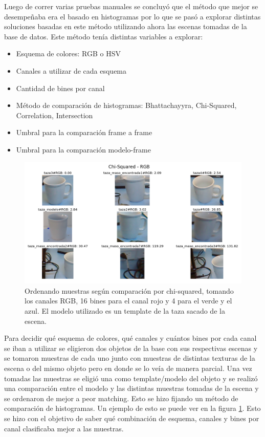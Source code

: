 Luego de correr varias pruebas manuales se concluyó que el método que mejor se desempeñaba era el basado en histogramas por lo que se pasó a explorar distintas soluciones basadas en este método utilizando ahora las escenas tomadas de la base de datos. Este método tenía distintas variables a explorar:
\begin{itemize}
	\item Esquema de colores: RGB o HSV
	\item Canales a utilizar de cada esquema
	\item Cantidad de bines por canal
	\item Método de comparación de histogramas: Bhattachayyra, Chi-Squared, Correlation, Intersection
	\item Umbral para la comparación frame a frame
	\item Umbral para la comparación modelo-frame	
\end{itemize}


\begin{figure}
	\centering
	\includegraphics[width=\textwidth]{img/results_chi-squared_rgb_16r_4g_4b.png}
	\caption{Ordenando muestras según comparación por chi-squared, tomando los canales RGB, 16 bines para el canal rojo y 4 para el verde y el azul. El modelo utilizado es un template de la taza sacado de la escena.}
	\label{pruebas_eleccion_canales}
\end{figure}

Para decidir qué esquema de colores, qué canales y cuántos bines por cada canal se iban a utilizar se eligieron dos objetos de la base con sus respectivas escenas y se tomaron muestras de cada uno junto con muestras de distintas texturas de la escena o del mismo objeto pero en donde se lo veía de manera parcial. Una vez tomadas las muestras se eligió una como template/modelo del objeto y se realizó una comparación entre el modelo y las distintas muestras tomadas de la escena y se ordenaron de mejor a peor matching. Esto se hizo fijando un método de comparación de histogramas. Un ejemplo de esto se puede ver en la figura \ref{pruebas_eleccion_canales}. Esto se hizo con el objetivo de saber qué combinación de esquema, canales y bines por canal clasificaba mejor a las muestras.


